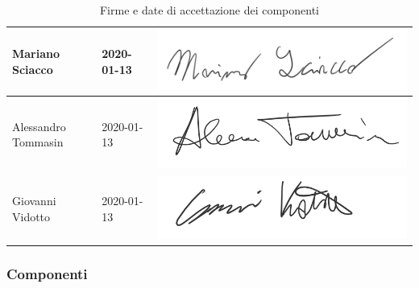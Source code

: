 \begin{table}[H]
\begin{tabular}{|l|l|l|}
					Mariano Sciacco & 2020-01-13 & \includegraphics[scale=0.6]{images/firme/mariano}  \\ \hline
					Alessandro Tommasin & 2020-01-13 & \includegraphics[scale=0.6]{images/firme/alessandro} \\ \hline
					Giovanni Vidotto & 2020-01-13 & \includegraphics[scale=0.6]{images/firme/giovanni} \\ \hline
				\end{tabular}
				\caption{Firme e date di accettazione dei componenti}
			\end{table}
			
		\subsubsection{Componenti}
			
